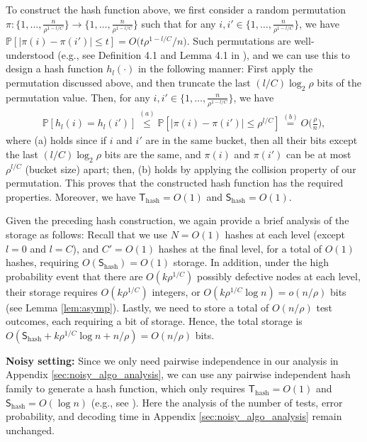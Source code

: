 To construct the hash function above, we first consider a random permutation $\pi:\{1,\dots,\frac{n}{\rho^{1-l/C}}\}\rightarrow\{1,\dots,\frac{n}{\rho^{1-l/C}}\}$ such that for any $i,i'\in\{1,\dots,\frac{n}{\rho^{1-l/C}}\big\}$, we have $\mathbb{P}[|\pi(i)-\pi(i')|\leq t]=O\big(t\rho^{1-l/C}/n\big)$.  Such permutations are well-understood (e.g., see Definition 4.1 and Lemma 4.1 in \cite{Cev16}), and we can use this to design a hash function $h_l(\cdot)$ in the following manner: First apply the permutation discussed above, and then truncate the last $(l/C)\log_2\rho$ bits of the permutation value.  Then, for any $i,i'\in\{1,\dots,\frac{n}{\rho^{1-l/C}}\big\}$, we have
\begin{align}
    \mathbb{P}[h_l(i)=h_l(i')]
    \stackrel{(a)}{\le}\mathbb{P}[|\pi(i)-\pi(i')|\leq\rho^{l/C}]
    \stackrel{(b)}{=}O\Big(\frac{\rho}{n}\Big),
\end{align}
where (a) holds since if $i$ and $i'$ are in the same bucket, then all their bits except the last $(l/C)\log_2\rho$ bits are the same, and $\pi(i)$ and $\pi(i')$ can be at most $\rho^{l/C}$ (bucket size) apart; then, (b) holds by applying the collision property of our permutation. This proves that the constructed hash function has the required properties.  Moreover, we have $\mathsf{T}_{\text{hash}}=O(1)$ and $\mathsf{S}_{\text{hash}}=O(1)$. %

Given the preceding hash construction, we again provide a brief analysis of the storage as follows: Recall that we use $N=O(1)$ hashes at each level (except $l=0$ and $l=C$), and $C'=O(1)$ hashes at the final level, for a total of $O(1)$ hashes, requiring $O(\mathsf{S}_{\text{hash}}) = O(1)$ storage. In addition, under the high probability event that there are $O(k\rho^{1/C})$ possibly defective nodes at each level, their storage requires $O(k\rho^{1/C})$ integers, or $O(k\rho^{1/C}\log n)=o(n/\rho)$ bits (see Lemma \ref{lem:asymp}). Lastly, we need to store a total of $O(n/\rho)$ test outcomes, each requiring a bit of storage. Hence, the total storage is $O(\mathsf{S}_{\text{hash}}+k\rho^{1/C}\log n+n/\rho)=O(n/\rho)$ bits.

\textbf{Noisy setting:} Since we only need pairwise independence in our analysis in Appendix \ref{sec:noisy_algo_analysis}, we can use any pairwise independent hash family to generate a hash function, which only requires $\mathsf{T}_{\text{hash}}=O(1)$ and $\mathsf{S}_{\text{hash}}=O(\log n)$ (e.g., see \cite[Section 3.1]{Eri20}).   Here the analysis of the number of tests, error probability, and decoding time in Appendix \ref{sec:noisy_algo_analysis} remain unchanged. 

